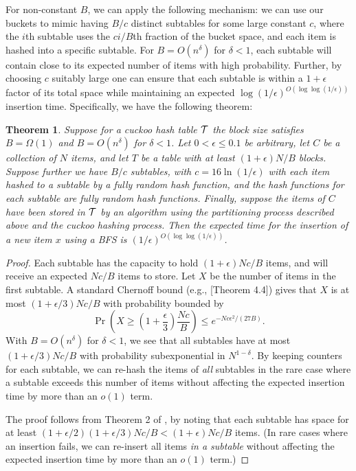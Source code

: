 \documentclass[11pt,letterpaper]{article}
\newtheorem{theorem}{Theorem}
\begin{document}
For non-constant $B$, we can apply the following mechanism:
we can use our buckets to mimic having $B/c$ distinct subtables for
some large constant $c$, where the $i$th subtable uses the $ci/B$th
fraction of the bucket space, and each item is hashed into a specific
subtable.  For $B = O(n^\delta)$ for $\delta < 1$, each subtable will contain
close to its expected number of items with high probability.  Further,
by choosing $c$ suitably large one can ensure that each subtable is
within a $1+\epsilon$ factor of its total space while maintaining an
expected $\log(1/\epsilon)^{O(\log \log (1/\epsilon))}$ insertion
time.  Specifically, we have the following theorem:
\begin{theorem} \label{thm:cuckoo}
Suppose for a cuckoo hash table ${\cal T}$ the block size satisfies
$B=\Omega(1)$ and $B=O(n^\delta)$ for $\delta < 1$.  Let $0 < \epsilon \leq 0.1$ be
arbitrary, let $C$ be a collection of $N$ items, and let $T$ be a
table with at least $(1+\epsilon)N/B$ blocks.  Suppose further we have
$B/c$ subtables, with $c = 16 \ln(1/\epsilon)$ with each item hashed
to a subtable by a fully random hash function, and the hash functions
for each subtable are fully random hash functions.
Finally, suppose the items of $C$ have been stored in ${\cal T}$ by
an algorithm using the partitioning process described above and the cuckoo hashing
process.  Then the expected time for the insertion of a new item $x$ using a BFS is
$(1/\epsilon)^{O(\log \log (1/\epsilon))}$.
\end{theorem}
\begin{proof}
Each subtable has the capacity to hold $(1+\epsilon)Nc/B$ items, and will
receive an expected $Nc/B$ items to store.  Let $X$ be the number of items
in the first subtable.  A standard Chernoff bound 
(e.g., \cite{mu-pcrap-05}[Theorem 4.4])  gives that 
$X$ is at most $(1+\epsilon/3)Nc/B$ with probability
bounded by
$$\Pr\left ( X \geq \left ( 1 + \frac{\epsilon}{3} \right) \frac{Nc}{B} \right) \leq e^{-Nc\epsilon^2/(27B)}.$$
With $B=O(n^\delta)$ for $\delta < 1$, we see that 
all subtables have at most $(1+\epsilon/3)Nc/B$ with probability subexponential in $N^{1-\delta}$.  By keeping
counters for each subtable, we can re-hash the items of {\em all} subtables in the rare case where a subtable
exceeds this number of items without affecting the expected insertion time by more than an $o(1)$ term.

The proof follows from Theorem 2 of \cite{dw-badtpcs-07}, by
noting that each subtable has space for at least
$(1+\epsilon/2)(1+\epsilon/3)Nc/B < (1+\epsilon)Nc/B$ items.  (In rare cases where an insertion fails,
we can re-insert all items {\em in a subtable} without affecting the expected insertion time by more than an $o(1)$ term.)
\end{proof}
\end{document}
